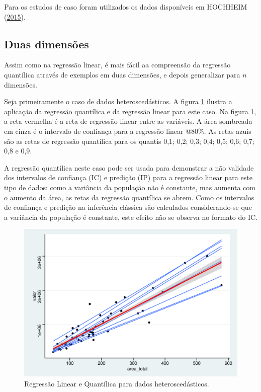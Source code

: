 \documentclass[a4paper, 12pt]{article}
\begin{document}
Para os estudos de caso foram utilizados os dados disponíveis em
HOCHHEIM (\protect\hyperlink{ref-hochheim}{2015}).

\hypertarget{duas-dimensoes}{%
\subsection{Duas dimensões}\label{duas-dimensoes}}

Assim como na regressão linear, é mais fácil aa compreensão da regressão
quantílica através de exemplos em duas dimensões, e depois generalizar
para \(n\) dimensões.

Seja primeiramente o caso de dados heteroscedásticos. A figura
\ref{fig:qr1} ilustra a aplicação da regressão quantílica e da regressão
linear para este caso. Na figura \ref{fig:qr1}, a reta vermelha é a reta
de regressão linear entre as variáveis. A área sombreada em cinza é o
intervalo de confiança para a regressão linear @80\%. As retas azuis são
as retas de regressão quantílica para os quantis 0,1; 0,2; 0,3; 0,4;
0,5; 0,6; 0,7; 0,8 e 0,9.

A regressão quantílica neste caso pode ser usada para demonstrar a não
validade dos intervalos de confiança (IC) e predição (IP) para a
regressão linear para este tipo de dados: como a variância da população
não é constante, mas aumenta com o aumento da área, as retas da
regressão quantílica se abrem. Como os intervalos de confiança e
predição na inferência clássica são calculados considerando-se que a
variância da população é constante, este efeito não se observa no
formato do IC.

\begin{figure}[H]

{\centering \includegraphics[width=0.7\linewidth]{images/qr1-1} 

}

\caption{Regressão Linear e Quantílica para dados heteroscedásticos.}\label{fig:qr1}
\end{figure}
\end{document}
